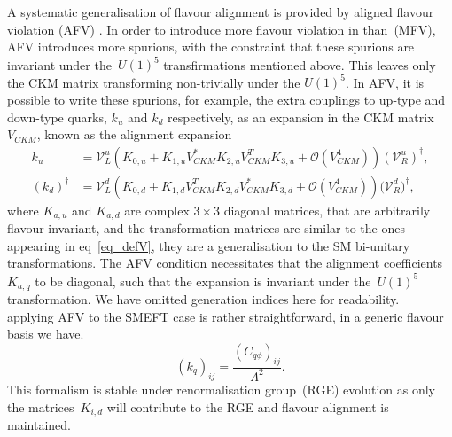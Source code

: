 A systematic generalisation of flavour alignment is provided by aligned flavour violation (AFV) \cite{Egana-Ugrinovic:2018znw, Egana-Ugrinovic:2019dqu}.  In order to introduce more flavour violation in than~(MFV), AFV introduces more spurions, with the constraint that these spurions are invariant under the~$U(1)^5$ transfirmations mentioned above. This leaves only the CKM matrix transforming non-trivially under the $U(1)^5$. In AFV, it is possible to write these spurions, for example, the extra couplings to up-type and down-type quarks, $k_u$ and $k_d$ respectively, as an expansion in the CKM matrix $V_{CKM}$, known as the alignment expansion 
\begin{align}
	k_u &=  \mathcal V_{L}^u    \left( K_{0,u}+ K_{1,u} V^*_{CKM} K_{2,u} V^T_{CKM} K_{3,u} + \mathcal O(V^4_{CKM})\right)  (\mathcal{V}^u_{R})^\dagger ,  \\
	(k_d)^\dagger&=  \mathcal V_{L}^d  \left( K_{0,d}+ K_{1,d} V^T_{CKM} K_{2,d} V^*_{CKM} K_{3,d} + \mathcal O(V^4_{CKM})\right) \mathcal  (\mathcal{V}^d_{R})^\dagger,
	\label{eqK}
\end{align}
where $K_{a,u}$ and $K_{a,d}$ are complex $3\times3$ diagonal matrices, that are arbitrarily flavour invariant, and the transformation matrices are similar to the ones appearing in eq~\eqref{eq_defV}, they are a generalisation to the SM bi-unitary transformations. The AFV condition necessitates that the alignment coefficients~$K_{a,q}$ to be diagonal, such that the expansion is invariant under the~$U(1)^5$ transformation.  We have omitted generation indices here for readability.\\ applying AFV to the SMEFT case is rather straightforward, in a generic flavour basis we have. 
\begin{equation}
	(k_q)_{ij} = \frac{(C_{q\phi})_{ij}}{\Lambda^2}.
\end{equation}
This formalism is stable under renormalisation group~(RGE) evolution as only the matrices~$K_{i,d}$ will contribute to the RGE and flavour alignment is maintained.
